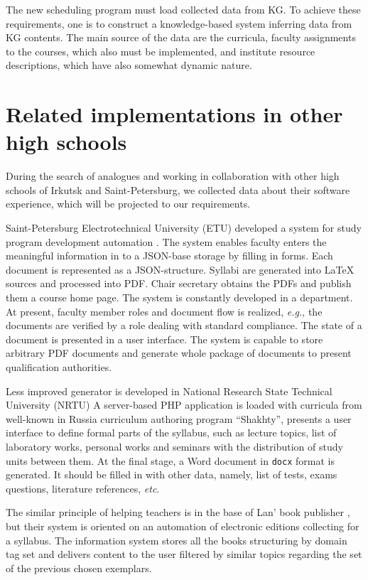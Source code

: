 \documentclass[
]{ceurart}
\begin{document}
The new scheduling program must load collected data from KG.  To achieve these requirements, one is to construct a knowledge-based system inferring data from KG contents.  The main source of the data are the curricula, faculty assignments to the courses, which also must be implemented, and institute resource descriptions, which have also somewhat dynamic nature.

\section{Related implementations in other high schools}

During the search of analogues and working in collaboration with other high schools of Irkutsk and Saint-Petersburg, we collected data about their software experience, which will be projected to our requirements.

Saint-Petersburg Electrotechnical University (ETU) developed a system for study program development automation \cite{leti}. %
The system enables faculty enters the meaningful information in to a JSON-base storage by filling in forms.  Each document is represented as a JSON-structure.  Syllabi are generated into \LaTeX{} sources and processed into PDF.  Chair secretary obtains the PDFs and publish them a course home page.  The system is constantly developed in a department.  At present, faculty member roles and document flow is realized, \emph{e.g.}, the documents are verified by a role dealing with standard compliance.  The state of a document is presented in a user interface.  The system is capable to store arbitrary PDF documents and generate whole package of documents to present qualification authorities.

Less improved generator is developed in National Research State Technical University (NRTU) \cite{nrtu} %
A server-based PHP application is loaded with curricula from well-known in Russia curriculum authoring program ``Shakhty'', presents a user interface to define formal parts of the syllabus, such as lecture topics, list of laboratory works, personal works and seminars with the distribution of study units between them.  At the final stage, a Word document in \verb|docx| format is generated.  It should be filled in with other data, namely, list of tests, exams questions, literature references, \emph{etc}.

The similar principle of helping teachers is in the base of Lan' book publisher \cite{lanbook}, but their system is oriented on an automation of electronic editions collecting for a syllabus.  The information system stores all the books structuring by domain tag set and delivers content to the user filtered by similar topics regarding the set of the previous chosen exemplars.
\end{document}
